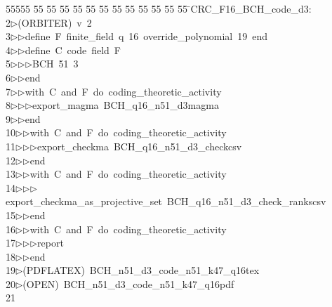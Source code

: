 %
%
\begin{tabbing}
55555 \= 55 \= 55 \= 55 \= 55 \= 55 \= 55 \= 55 \= 55 \= 55 \= 55 \= 55 \= 55 \= \>CRC\_F16\_BCH\_code\_d3:\\[0pt]
2\>$\triangleright$\>(ORBITER)\ v\ 2\ \\[0pt]
3\>$\triangleright$\>$\triangleright$\>define\ F\ finite\_field\ q\ 16\ override\_polynomial\ 19\ end\ \\[0pt]
4\>$\triangleright$\>$\triangleright$\>define\ C\ code\ field\ F\ \\[0pt]
5\>$\triangleright$\>$\triangleright$\>$\triangleright$\>BCH\ 51\ 3\ \\[0pt]
6\>$\triangleright$\>$\triangleright$\>end\ \\[0pt]
7\>$\triangleright$\>$\triangleright$\>with\ C\ and\ F\ do\ coding\_theoretic\_activity\ \\[0pt]
8\>$\triangleright$\>$\triangleright$\>$\triangleright$\>export\_magma\ BCH\_q16\_n51\_d3magma\ \\[0pt]
9\>$\triangleright$\>$\triangleright$\>end\ \\[0pt]
10\>$\triangleright$\>$\triangleright$\>with\ C\ and\ F\ do\ coding\_theoretic\_activity\ \\[0pt]
11\>$\triangleright$\>$\triangleright$\>$\triangleright$\>export\_checkma\ BCH\_q16\_n51\_d3\_checkcsv\ \\[0pt]
12\>$\triangleright$\>$\triangleright$\>end\ \\[0pt]
13\>$\triangleright$\>$\triangleright$\>with\ C\ and\ F\ do\ coding\_theoretic\_activity\ \\[0pt]
14\>$\triangleright$\>$\triangleright$\>$\triangleright$\>export\_checkma\_as\_projective\_set\ BCH\_q16\_n51\_d3\_check\_rankscsv\ \\[0pt]
15\>$\triangleright$\>$\triangleright$\>end\ \\[0pt]
16\>$\triangleright$\>$\triangleright$\>with\ C\ and\ F\ do\ coding\_theoretic\_activity\ \\[0pt]
17\>$\triangleright$\>$\triangleright$\>$\triangleright$\>report\ \\[0pt]
18\>$\triangleright$\>$\triangleright$\>end\\[0pt]
19\>$\triangleright$\>(PDFLATEX)\ BCH\_n51\_d3\_code\_n51\_k47\_q16tex\\[0pt]
20\>$\triangleright$\>(OPEN)\ BCH\_n51\_d3\_code\_n51\_k47\_q16pdf\\[0pt]
21\>\end{tabbing}

